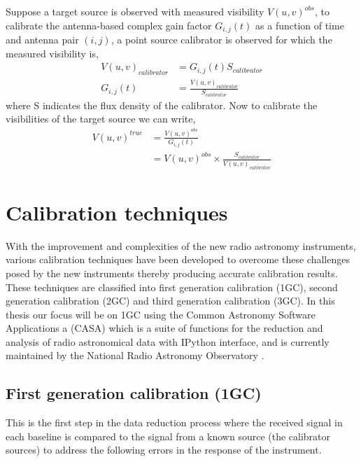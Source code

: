 Suppose a target source is observed with measured visibility $V(u,v)^{obs}$, to calibrate the antenna-based complex gain factor $G_{i,j}(t)$ as a function of time and antenna pair $(i,j)$, a point source calibrator is observed for which the measured visibility is, 
\begin{align}
V(u,v)_{calibrator}&= G_{i,j}(t) S_{calibrator}\\
G_{i,j}(t)&= \frac{V(u,v)_{calibrator}}{S_{calibrator}}
\end{align}
\citep{thompson2001interferometry}
where S indicates the flux density of the calibrator. Now to calibrate the visibilities of the target source we can write, 
\begin{align}
V(u,v)^{true}&= \frac{V(u,v)^{obs}}{G_{i,j}(t)}\\
&= V(u,v)^{obs} \times \frac{S_{calibrator}}{V(u,v)_{calibrator}} 
\end{align}
\citep{thompson2001interferometry} 

\section{Calibration techniques}
\label{caltech}
With the improvement and complexities of the new radio astronomy instruments, various calibration techniques have been developed to overcome these challenges  posed by the new instruments thereby producing accurate calibration results. These techniques are classified into first generation calibration (1GC), second generation calibration (2GC) and third generation calibration (3GC). In this thesis our focus will be on 1GC using the Common Astronomy Software Applications a (CASA) which is a suite of functions for the reduction and analysis of radio astronomical data with IPython interface, and is currently maintained by the National Radio Astronomy Observatory \citep{mcmullin2007casa}. 

\subsection{First generation calibration (1GC)}

This is the first step in the data reduction process where the received signal in each baseline is compared to the signal from a known source (the calibrator sources) to address the following errors in the response of the instrument. 

